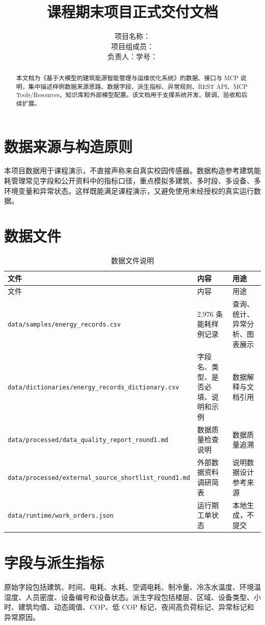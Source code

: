 \documentclass[12pt,a4paper]{ctexart}
\title{
    \vspace{-2em}
    \heiti \zihao{2} \reporttitle \\
    \vspace{1em}
    \zihao{4} 课程期末项目正式交付文档
}
\author{
    \songti \zihao{4}
    项目名称：\projectname \\
    项目组成员：\teamname \\
    负责人：\studentname \quad 学号：\studentid
}
\date{\docdate}
\newcommand{\projectname}{基于大模型的建筑能源智能管理与运维优化系统}
\newcommand{\code}[1]{{\footnotesize\nolinkurl{#1}}}
\begin{document}
\maketitle
\thispagestyle{fancy}

\begin{abstract}
本文档为《\projectname》的数据、接口与 MCP 说明，集中描述样例数据来源思路、数据字段、派生指标、异常规则、REST API、MCP Tools/Resources、知识库和外部模型配置。该文档用于支撑系统开发、联调、验收和后续扩展。
\end{abstract}

\tableofcontents
\newpage

\section{数据来源与构造原则}
本项目数据用于课程演示，不直接声称来自真实校园传感器。数据构造参考建筑能耗管理常见字段和公开资料中的指标口径，重点模拟多建筑、多时段、多设备、多环境变量和异常状态。这样既能满足课程演示，又避免使用未经授权的真实运行数据。

\section{数据文件}
\begin{longtable}{p{4cm}p{5.5cm}p{4.5cm}}
\caption{数据文件说明}\\
\toprule
文件 & 内容 & 用途 \\
\midrule
\endfirsthead
\toprule
文件 & 内容 & 用途 \\
\midrule
\endhead
\code{data/samples/energy_records.csv} & 2,976 条能耗样例记录 & 查询、统计、异常分析、图表展示 \\
\code{data/dictionaries/energy_records_dictionary.csv} & 字段名、类型、是否必填、说明和示例 & 数据解释与文档引用 \\
\code{data/processed/data_quality_report_round1.md} & 数据质量检查说明 & 数据质量追溯 \\
\code{data/processed/external_source_shortlist_round1.md} & 外部数据资料调研简表 & 说明数据设计参考来源 \\
\code{data/runtime/work_orders.json} & 运行期工单状态 & 本地生成，不提交 \\
\bottomrule
\end{longtable}

\section{字段与派生指标}
原始字段包括建筑、时间、电耗、水耗、空调电耗、制冷量、冷冻水温度、环境温湿度、人员密度、设备编号和设备状态。派生字段包括楼层、区域、设备类型、小时、建筑均值、动态阈值、COP、低 COP 标记、夜间高负荷标记、异常标记和异常原因。
\end{document}
